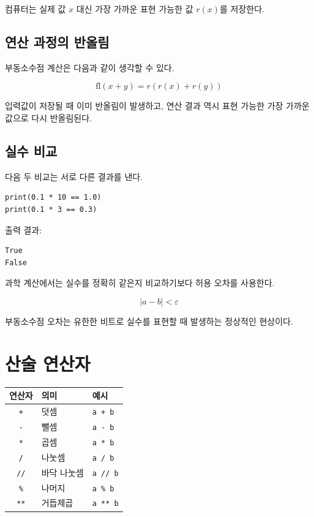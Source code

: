\documentclass[11pt,a4paper]{article}
\begin{document}
컴퓨터는 실제 값 \(x\) 대신 가장 가까운 표현 가능한 값 \(r(x)\)를 저장한다.

\subsection{연산 과정의 반올림}

부동소수점 계산은 다음과 같이 생각할 수 있다.

\[
\mathrm{fl}(x+y)=r(r(x)+r(y))
\]

입력값이 저장될 때 이미 반올림이 발생하고,
연산 결과 역시 표현 가능한 가장 가까운 값으로 다시 반올림된다.

\subsection{실수 비교}

다음 두 비교는 서로 다른 결과를 낸다.

\begin{lstlisting}
print(0.1 * 10 == 1.0)
print(0.1 * 3 == 0.3)
\end{lstlisting}

출력 결과:

\begin{verbatim}
True
False
\end{verbatim}

과학 계산에서는 실수를 정확히 같은지 비교하기보다 허용 오차를 사용한다.

\[
|a-b|<\varepsilon
\]

\begin{importantbox}
부동소수점 오차는 유한한 비트로 실수를 표현할 때 발생하는 정상적인 현상이다.
\end{importantbox}

\section{산술 연산자}

\begin{center}
\begin{tabular}{cll}
\toprule
연산자 & 의미 & 예시 \\
\midrule
\texttt{+} & 덧셈 & \texttt{a + b} \\
\texttt{-} & 뺄셈 & \texttt{a - b} \\
\texttt{*} & 곱셈 & \texttt{a * b} \\
\texttt{/} & 나눗셈 & \texttt{a / b} \\
\texttt{//} & 바닥 나눗셈 & \texttt{a // b} \\
\texttt{\%} & 나머지 & \texttt{a \% b} \\
\texttt{**} & 거듭제곱 & \texttt{a ** b} \\
\bottomrule
\end{tabular}
\end{center}
\end{document}
